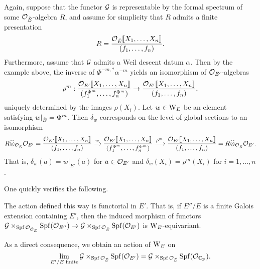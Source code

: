 \documentclass[../main.tex]{subfiles}
\begin{document}
\begin{xpl}
  Again, suppose that the functor 
  $\mathcal{G}$ is representable by the formal spectrum of some $\mathcal{O}_{{\breve {E}}}$-algebra $R$,
  and assume for simplicity that $R$ admits a finite presentation
  \begin{equation*}
    R = \frac{\mathcal{O}_{\breve {E}} \llbracket X_1, \dots, X_n\rrbracket}{(f_1, \dots, f_n)}.
  \end{equation*}
  Furthermore, assume that $\mathcal{G}$ admits a Weil descent datum $\alpha$. 
  Then by the example above, the inverse of $\Phi^{-m, *} \alpha^{-m}$
  yields an isomorphism of $\mathcal{O}_{{E'}}$-algebras
  \begin{equation*}
    \rho^m: \frac{\mathcal{O}_{{E'}} \llbracket X_1, \dots, X_n\rrbracket}{(f_1^{\Phi^m},
    \dots, f_n^{\Phi^m})} \to 
    \frac{\mathcal{O}_{{E'}} \llbracket X_1, \dots, X_n\rrbracket}{(f_1, \dots, f_n)},
  \end{equation*}
  uniquely determined by the images $\rho(X_i)$. 
  Let $w \in \mathrm W_E$ be an element satisfying $w|_{{\breve {E}}} = \Phi^{m}$.
  Then $\delta_w$ corresponds on the level of global sections to an isomorphism
  \begin{equation*}
    R \widehat \otimes_{\mathcal{O}_{\breve {E}}} \mathcal{O}_{{E'}} = 
    \frac{\mathcal{O}_{{E'}} \llbracket X_1, \dots,
    X_n\rrbracket}{(f_1, \dots, f_n)} \xrightarrow{w}  \frac{\mathcal{O}_{{E'}} \llbracket X_1, \dots,
        X_n\rrbracket}{(f_1^{\Phi^m}, \dots, f_n^{\Phi^m})} \xrightarrow{\rho^m}
        \frac{\mathcal{O}_{{E'}} \llbracket X_1, \dots, X_n\rrbracket}{(f_1, \dots, f_n)} = R
        \widehat \otimes_{\mathcal{O}_{\breve {E}}} {\mathcal{O}_{{E'}}}.
  \end{equation*}
  That is, $\delta_w(a) = w|_{E'}(a)$ for $a \in \mathcal{O}_{{E'}}$ and $\delta_w(X_i) =
  \rho^m(X_i)$ for $i= 1, \dots, n$.  
  \end{xpl}

One quickly verifies the following.

\begin{lem}\label{lem:WeilGroupActionIsFunctorialInE}
  The action defined this way is functorial in $E'$. That is, if $E''/E$ is a
  finite Galois extension containing $E'$, then the induced morphism 
  of functors 
  $\mathcal{G} \times_{\operatorname{Spf} \mathcal{O}_{{\breve {\mathcal{O}}}_E}} \operatorname{Spf}(\mathcal{O}_{E''}) \to 
  \mathcal{G} \times_{\operatorname{Spf} \mathcal{O}_{\breve {E}}} \operatorname{Spf}(\mathcal{O}_{E'})$
  is $\mathrm W_E$-equivariant. 
\end{lem}
As a direct consequence, we obtain an action of $\mathrm W_E$ on
$$\lim_{E'/E \text{ finite}} \cG \times_{\spf \cO_\br E} \spf(\cO_{E'}) = 
\cG \times_{\spf \cO_\br E} \spf(\cO_{\Cp}).$$
\end{document}
